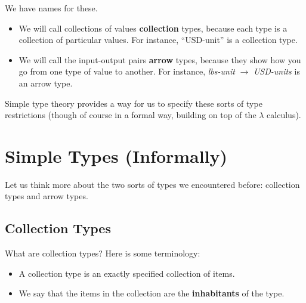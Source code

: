 \documentclass{book}
\numberwithin{equation}{chapter}
\newcommand{\vocab}{\textbf}
\begin{document}
\noindent
We have names for these.

\begin{itemize}

\item{We will call collections of values \vocab{collection} types, because each type is a collection of particular values. For instance, ``USD-unit'' is a collection type.}

\item{We will call the input-output pairs \vocab{arrow} types, because they show how you go from one type of value to another. For instance, \textit{lbs-unit} $\rightarrow$ \textit{USD-units} is an arrow type.}

\end{itemize}

\noindent
Simple type theory provides a way for us to specify these sorts of type restrictions (though of course in a formal way, building on top of the $\lambda$ calculus).


\chapter{Simple Types (Informally)}

Let us think more about the two sorts of types we encountered before: collection types and arrow types.


\section{Collection Types}

What are collection types? Here is some terminology:

\begin{itemize}

\item{A collection type is an exactly specified collection of items.} 

\item{We say that the items in the collection are the \vocab{inhabitants} of the type.}

\end{itemize}
\end{document}
